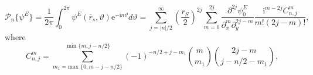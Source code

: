 \documentclass[ 12pt, a4paper]{article}
\newcommand{\be}{\begin{equation}}
\newcommand{\en}{\end{equation}}
\newcommand{\ii}{\textrm{i}}
\newcommand{\ee}{\textrm{e}}
\begin{document}
\be
\mathcal P_n\{\psi^E \}= \frac{1}{2 \pi}\int_{0}^{2 \pi} \psi^E(\bar r_s, \vartheta)\ee^{- \ii n \vartheta} d \vartheta = \sum_{j= |n|/2}^\infty \left (\frac{r_S}{2}\right)^{ 2 j} \sum_{m= 0}^{2 j} \frac{\partial^{ 2 j} \psi^E_0}{\partial_{x}^m \partial_{y}^{{ 2 j}-m}}  \frac{\ii^{ m-2 j} C^m_{n,  j }  }{m! (2 j -m)!} ,
\label{eqn:PsiTaylor}
\en
where
\be
C^m_{n,j} = \sum_{m_1= \text{max } \{0,  m -j -n/2 \}}^{\text{ min } \{m, j -n/2\}} (-1)^{-n/2 +j- m_1} \binom{m}{m_1} \binom{ 2 j -m}{ j  -n/2- m_1},
\en
\end{document}
